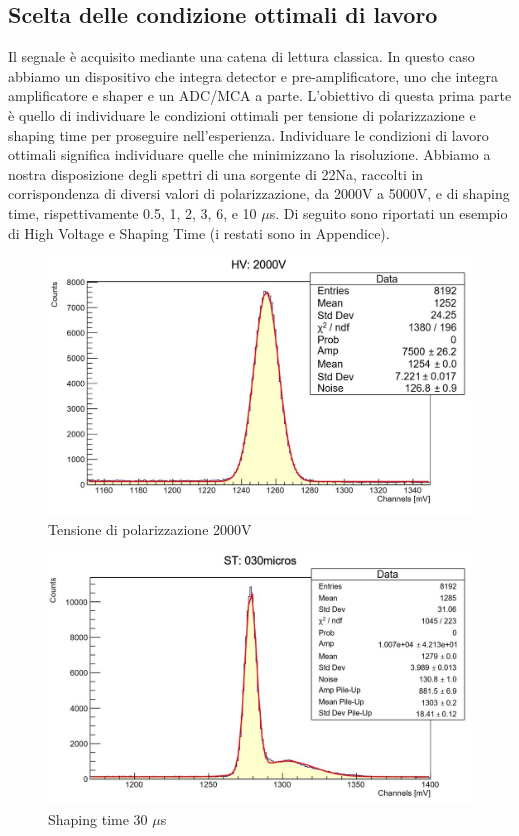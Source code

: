 \documentclass[a4paper,10pt]{article}
\begin{document}

\subsection{Scelta delle condizione ottimali di lavoro}
Il segnale \`e acquisito mediante una catena di lettura classica. In questo caso abbiamo un dispositivo che integra detector e pre-amplificatore, uno che integra amplificatore e shaper e un ADC/MCA a parte. L'obiettivo di questa prima parte \`e quello di individuare le condizioni ottimali per tensione di polarizzazione e shaping time per proseguire nell'esperienza. Individuare le condizioni di lavoro ottimali significa individuare quelle che minimizzano la risoluzione. Abbiamo a nostra disposizione degli spettri di una sorgente di 22Na, raccolti in corrispondenza di diversi valori di polarizzazione, da 2000V a 5000V, e di shaping time, rispettivamente 0.5, 1, 2, 3, 6, e 10 $\mu$s. Di seguito sono riportati un esempio di High Voltage e Shaping Time (i restati sono in Appendice).

\begin{figure}[!h]
    \centering
    \includegraphics[scale=0.6]{grafici/hv}
    \caption{Tensione di polarizzazione 2000V}
\end{figure}

\begin{figure}[!h]
    \centering
    \includegraphics[scale=0.6]{grafici/st}
    \caption{Shaping time 30 $\mu$s}
\end{figure}
\end{document}
